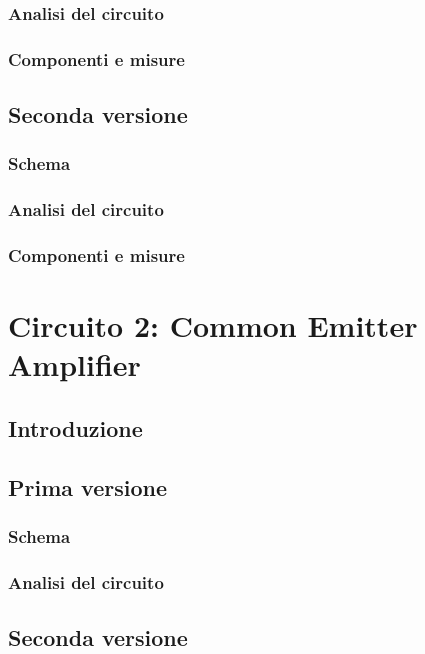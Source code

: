 \subsection{Analisi del circuito} 
\subsection{Componenti e misure} 
\section{Seconda versione} %
\subsection{Schema} 
\subsection{Analisi del circuito} %
\subsection{Componenti e misure} 


\clearpage
\newpage
\chapter{Circuito 2: Common Emitter Amplifier}
\section{Introduzione} 
\section{Prima versione} %
\subsection{Schema} 
\subsection{Analisi del circuito} 
\section{Seconda versione} %
